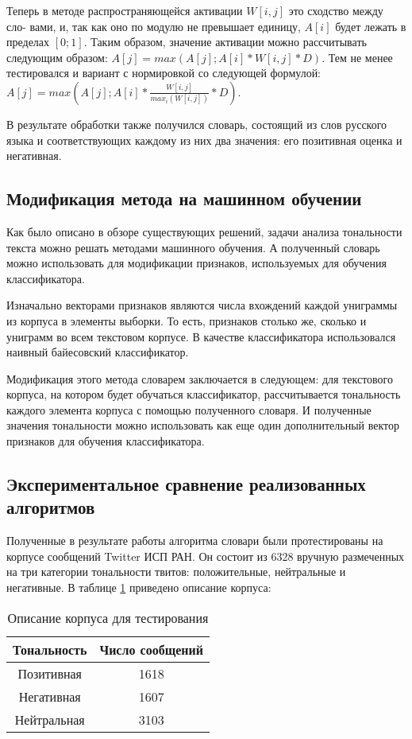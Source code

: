 Теперь в методе распространяющейся активации $W[i, j]$ это сходство между сло-
вами, и, так как оно по модулю не превышает единицу, $A[i]$ будет лежать в пределах
$[0;1]$. Таким образом, значение активации можно рассчитывать следующим образом:
$A[j] = max(A[j]; A[i] * W[i, j] * D)$. Тем не менее тестировался и вариант с нормировкой
со следующей формулой: $A[j] = max(A[j]; A[i] * \frac{W[i,j]}{max_i(W[i,j])} * D)$.

В результате обработки также получился словарь, состоящий из слов русского
языка и соответствующих каждому из них два значения: его позитивная оценка и
негативная.

\subsection{Модификация метода на машинном обучении}
Как было описано в обзоре существующих решений, задачи анализа тональности
текста можно решать методами машинного обучения. А полученный словарь можно
использовать для модификации признаков, используемых для обучения
классификатора.

Изначально векторами признаков являются числа вхождений каждой униграммы из
корпуса в элементы выборки. То есть, признаков столько же, сколько и униграмм во
всем текстовом корпусе. В качестве классификатора использовался наивный
байесовский классификатор.

Модификация этого метода словарем заключается в следующем: для текстового
корпуса, на котором будет обучаться классификатор, рассчитывается тональность
каждого элемента корпуса с помощью полученного словаря. И полученные значения
тональности можно использовать как еще один дополнительный вектор признаков
для обучения классификатора.

\subsection{Экспериментальное сравнение реализованных алгоритмов}
Полученные в результате работы алгоритма словари были протестированы на
корпусе сообщений Twitter ИСП РАН. Он состоит из 6328 вручную размеченных на
три категории тональности твитов: положительные, нейтральные и негативные. В
таблице \ref{tab1} приведено описание корпуса:

\begin{table}[!h]
\caption{Описание корпуса для тестирования}
\label{tab1}
\centering
\begin{tabular}{| c | c |}
  \cline{1-2}
  Тональность & Число сообщений \\\hline
  Позитивная & 1618 \\
  Негативная & 1607 \\
  Нейтральная & 3103 \\
  \cline{1-2}
\end{tabular}
\end{table}

